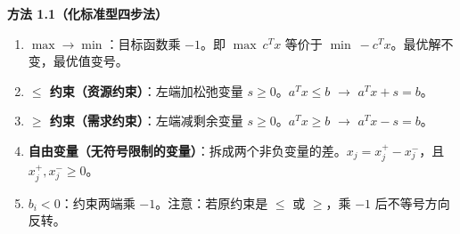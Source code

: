 \begin{defbox}
\textbf{方法 1.1（化标准型四步法）}

\begin{enumerate}
  \item \textbf{$\max \to \min$}：目标函数乘 $-1$。即 $\max\ c^T x$ 等价于 $\min\ -c^T x$。最优解不变，最优值变号。
  \item \textbf{$\le$ 约束（资源约束）}：左端加松弛变量 $s \ge 0$。$a^T x \le b$ $\to$ $a^T x + s = b$。
  \item \textbf{$\ge$ 约束（需求约束）}：左端减剩余变量 $s \ge 0$。$a^T x \ge b$ $\to$ $a^T x - s = b$。
  \item \textbf{自由变量（无符号限制的变量）}：拆成两个非负变量的差。$x_j = x_j^+ - x_j^-$，且 $x_j^+, x_j^- \ge 0$。
  \item \textbf{$b_i < 0$}：约束两端乘 $-1$。注意：若原约束是 $\le$ 或 $\ge$，乘 $-1$ 后不等号方向反转。
\end{enumerate}
\end{defbox}

